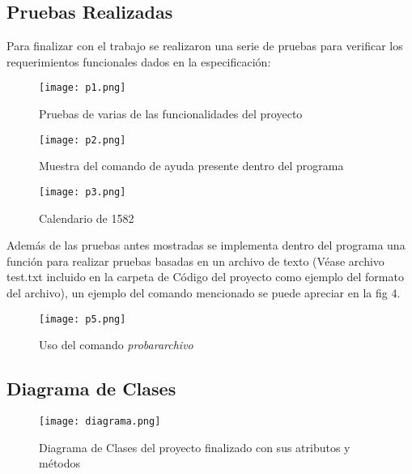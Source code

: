 \documentclass[10pt,journal,compsoc]{IEEEtran}
\begin{document}
\subsection{Pruebas Realizadas}
	\par Para finalizar con el trabajo se realizaron una serie de pruebas para verificar los requerimientos funcionales dados en la especificación:
	\begin{figure}[h!]
		\centering
		\texttt{[image: p1.png]}
		\caption{Pruebas de varias de las funcionalidades del proyecto}
	\end{figure}
	\begin{figure}[h!]
		\centering
		\texttt{[image: p2.png]}
		\caption{Muestra del comando de ayuda presente dentro del programa}
	\end{figure}
	\begin{figure}[h!]
		\centering
		\texttt{[image: p3.png]}
		\caption{Calendario de 1582}
	\end{figure}
	\par Además de las pruebas antes mostradas se implementa dentro del programa una función para realizar pruebas basadas en un archivo de texto (Véase archivo test.txt incluido en la carpeta de Código del proyecto como ejemplo del formato del archivo), un ejemplo del comando mencionado se puede apreciar en la fig 4.
	\begin{figure}[h!]
		\centering
		\texttt{[image: p5.png]}
		\caption{Uso del comando \textit{probar\textunderscore archivo}}
	\end{figure}
\subsection{Diagrama de Clases}
	\begin{figure}[h!]
		\centering
		\texttt{[image: diagrama.png]}
		\caption{Diagrama de Clases del proyecto finalizado con sus atributos y métodos}
	\end{figure}
\end{document}
